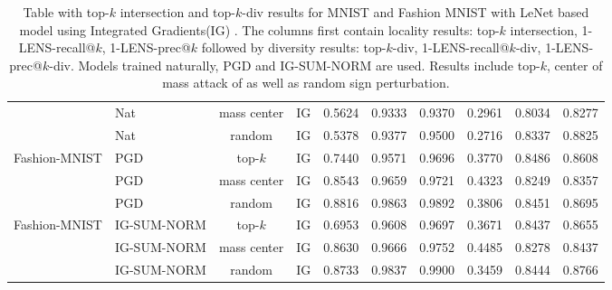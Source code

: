 \documentclass[letterpaper]{article} %
\begin{document}
\begin{table}[!ht]
\begin{center}
{\begin{tabular}{|l|l|c|c|c|c|c|c|c|c|}
      & Nat & mass center   & IG & 0.5624 & 0.9333 & 0.9370 & 0.2961 & 0.8034 & 0.8277 \\ 
      & Nat & random & IG & 0.5378 & 0.9377 & 0.9500 & 0.2716 & 0.8337 & 0.8825 \\ 
\hline
Fashion-MNIST & PGD & top-$k$ & IG & 0.7440 & 0.9571 & 0.9696 & 0.3770 & 0.8486 & 0.8608 \\ 
      & PGD & mass center   & IG & 0.8543 & 0.9659 & 0.9721 & 0.4323 & 0.8249 & 0.8357 \\ 
      & PGD & random & IG & 0.8816 & 0.9863 & 0.9892 & 0.3806 & 0.8451 & 0.8695 \\ 
\hline
Fashion-MNIST & IG-SUM-NORM & top-$k$ & IG & 0.6953 & 0.9608 & 0.9697 & 0.3671 & 0.8437 & 0.8655 \\ 
      & IG-SUM-NORM & mass center   & IG & 0.8630 & 0.9666 & 0.9752 & 0.4485 & 0.8278 & 0.8437 \\ 
      & IG-SUM-NORM & random & IG & 0.8733 & 0.9837 & 0.9900 & 0.3459 & 0.8444 & 0.8766 \\ 
\hline
\end{tabular}
}
\end{center}
    \caption{Table with top-$k$ intersection and top-$k$-div results for MNIST and Fashion MNIST with LeNet based model using Integrated Gradients(IG) \citep{SundararajanTY17}. The columns first contain locality results: top-$k$ intersection, 1-LENS-recall@$k$, 1-LENS-prec@$k$ followed by diversity results: top-$k$-div, 1-LENS-recall@$k$-div, 1-LENS-prec@$k$-div. Models trained naturally, PGD and IG-SUM-NORM are used. Results include top-$k$, center of mass attack of \citet{ghorbani2018interpretation} as well as random sign perturbation.}
\label{table-topk-div-results-mnist-fmnist-ig}
\end{table}
\end{document}

